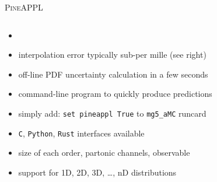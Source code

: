 \begin{frame}{\textrm{\textsc{PineAPPL}}}
\fontsize{9}{11}\selectfont
\begin{columns}[T,onlytextwidth]
\begin{column}{.5\textwidth}
\begin{itemize}
\item {}
\item interpolation error typically sub-per mille (see right)
\item off-line PDF uncertainty calculation in a few seconds
\item command-line program to quickly produce predictions
\item simply add: \texttt{set pineappl True} to \texttt{mg5\_aMC} runcard
\item \texttt{C}, \texttt{Python}, \texttt{Rust} interfaces available
\item size of each order, partonic channels, observable
\item support for 1D, 2D, 3D, \ldots, nD distributions
\end{itemize}

\vspace*{0.5cm}


\end{column}
\end{columns}
\end{frame}
